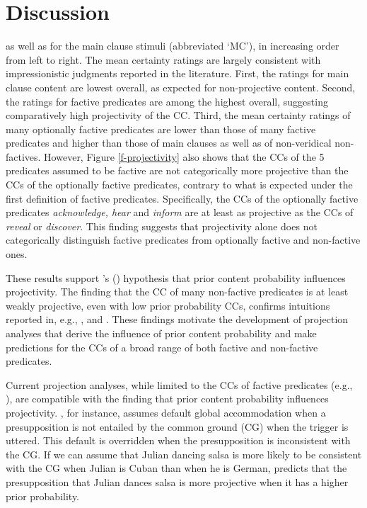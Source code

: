 \documentclass[11pt,fleqn]{article}
\newcommand{\6}{\mbox{$[\hspace*{-.6mm}[$}}
\newcommand{\9}{\mbox{$]\hspace*{-.6mm}]$}}
\newcommand{\citetpos}[1]{\citeauthor{#1}'s (\citeyear{#1})}
\begin{document}
\section{Discussion}\label{s4}


as well as for the main clause stimuli (abbreviated `MC'), in increasing order from left to right. The mean certainty ratings are largely consistent with impressionistic judgments reported in the literature. First, the ratings for main clause content are lowest overall, as expected for non-projective content. Second, the ratings for factive predicates are among the highest overall, suggesting comparatively high projectivity of the CC. Third, the mean certainty ratings of many optionally factive predicates are lower than those of many factive predicates and higher than those of main clauses as well as of non-veridical non-factives. However, Figure \ref{f-projectivity} also shows that the CCs of the 5 predicates assumed to be factive are not categorically more projective than the CCs of the optionally factive predicates, contrary to what is expected under the first definition of factive predicates. Specifically, the CCs of the optionally factive predicates {\em acknowledge, hear} and {\em inform} are at least as projective as the CCs of {\em reveal} or {\em discover}. This finding suggests that projectivity alone does not categorically distinguish factive predicates from optionally factive and non-factive ones.


These results support \citetpos{tbd-variability} hypothesis that prior content probability influences projectivity. The finding that the CC of many non-factive predicates is at least weakly projective, even with low prior probability CCs, confirms intuitions reported in, e.g., \citealt{schlenker10}, \citealt{anand-hacquard2014} and \citealt{spector-egre2015}. These findings motivate the development of projection analyses that derive the influence of prior content probability and make predictions for the CCs of a broad range of both factive and non-factive predicates.

Current projection analyses, while limited to the CCs of factive predicates (e.g., \citealt{heim83,vds92,abrusan2011,brst-salt10,brst-ar}), are compatible with the finding that prior content probability influences projectivity. \citealt{heim83}, for instance, assumes default global accommodation when a presupposition is not entailed by the common ground (CG) when the trigger is uttered. This default is overridden when the presupposition is inconsistent with the CG. If we can assume that Julian dancing salsa is more likely to be consistent with the CG when Julian is Cuban than when he is German, \citealt{heim83} predicts that the presupposition that Julian dances salsa is more projective when it has a higher prior probability. 
\end{document}
